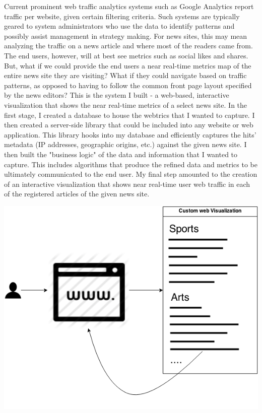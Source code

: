 \documentclass[12pt]{article}
\begin{document}
Current prominent web traffic analytics systems such as Google Analytics report traffic per website, given certain filtering criteria. Such systems are typically geared to system administrators who use the data to identify patterns and possibly assist management in strategy making. For news sites, this may mean analyzing the traffic on a news article and where most of the readers came from. The end users, however, will at best see metrics such as social likes and shares. But, what if we could provide the end users a near real-time metrics map of the entire news site they are visiting? What if they could navigate based on traffic patterns, as opposed to having to follow the common front page layout specified by the news editors? This is the system I built - a web-based, interactive visualization that shows the near real-time metrics of a select news site.
In the first stage, I created a database to house the webtrics that I wanted to capture. I then created a server-side library that could be included into any website or web application. This library hooks into my database and efficiently captures the hits' metadata (IP addresses, geographic origins, etc.) against the given news site.
I then built the "business logic" of the data and information that I wanted to capture. This includes algorithms that produce the refined data and metrics to be ultimately communicated to the end user.
My final step amounted to the creation of an interactive visualization that shows near real-time user web traffic in each of the registered articles of the given news site.

\includegraphics[scale=0.6]{img/overall_chart}
\end{document}
